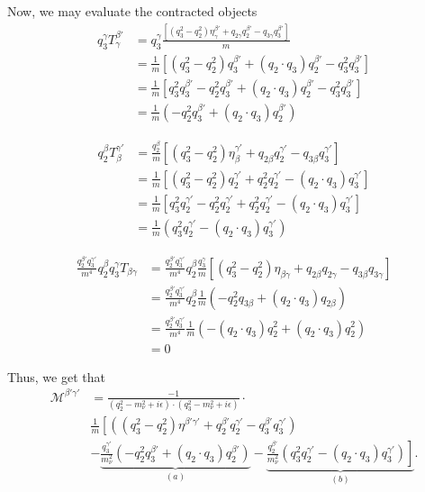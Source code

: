 \documentclass[12pt]{article}
\numberwithin{figure}{section}
\numberwithin{table}{section}
\newcommand{\eps}{\epsilon}
\newcommand{\paren}[1]{\left(#1\right)}
\newcommand{\bracket}[1]{\left[#1\right]}
\newcommand{\p}[1]{\left(#1\right)}
\begin{document}
Now, we may evaluate the contracted objects
\begin{align*}
      q^\gamma_3T_\gamma^{\beta'} &=  q_3^\gamma\frac{\bracket{\paren{q_3^2-q_2^2}\eta_{\gamma}^{\beta'} +q_{2\gamma}q_{2}^{\beta'}-q_{3\gamma}q_{3}^{\beta'} }}{m}\\
    &= \frac{1}{m}\bracket{\paren{q_3^2-q_2^2}q_3^{\beta'}+ (q_2\cdot q_3)q_2^{\beta'} - q_3^2 q_3^{\beta'}}\\
    &=  \frac{1}{m}\bracket{q_3^2q_3^{\beta'}-q_2^2q_3^{\beta'}+ (q_2\cdot q_3)q_2^{\beta'}-q_3^2q_3^{\beta'}}\\
    &= \frac{1}{m}\paren{-q_2^2q_3^{\beta'}+ (q_2\cdot q_3)q_2^{\beta'}}
\end{align*}

\begin{align*}
    q^\beta_2T^{\gamma'}_{\beta} &=  \frac{ q^\beta_2}{m}\bracket{\paren{q_3^2-q_2^2}\eta_{\beta}^{\gamma'} +q_{2\beta}q_{2}^{\gamma'}-q_{3\beta}q_{3}^{\gamma'} }\\
    &= \frac{1}{m}\bracket{\paren{q_3^2-q_2^2}q_2^{\gamma'}+ q_2^2q_2^{\gamma'} - (q_2\cdot q_3)q_3^{\gamma'}}\\
    &=  \frac{1}{m}\bracket{q_3^2q_2^{\gamma'}-q_2^2q_2^{\gamma'}+ q_2^2 q_2^{\gamma'} - (q_2\cdot q_3)q_3^{\gamma'}}\\
    &= \frac{1}{m}\paren{q_3^2q_2^{\gamma'} - (q_2\cdot q_3)q_3^{\gamma'}}
\end{align*}

\begin{align*}
   \frac{q_2^{\beta'}q_3^{\gamma'}}{m^4}q_2^\beta q^\gamma_3 T_{\beta\gamma} &=   \frac{q_2^{\beta'}q_3^{\gamma'}}{m^4}q_2^\beta\frac{q_3^\gamma}{m}\bracket{\paren{q_3^2-q_2^2}\eta_{\beta\gamma} +q_{2\beta}q_{2\gamma}-q_{3\beta}q_{3\gamma} } \\
   &=
   \frac{q_2^{\beta'}q_3^{\gamma'}}{m^4}q_2^\beta\frac{1}{m}\paren{-q_2^2q_{3\beta}+ (q_2\cdot q_3)q_{2\beta}} \\
   &= \frac{q_2^{\beta'}q_3^{\gamma'}}{m^4}\frac{1}{m}\paren{-(q_2\cdot q_3)q_2^2  + (q_2\cdot q_3)q_2^2}\\
   &= 0
\end{align*}

Thus, we get that
\begin{align*}
    \mathcal{M}^{\beta'\gamma'}&= \frac{-1}{\p{q_2^2-m_\nu^2+i\eps}\cdot \paren{q_3^2-m_\nu^2+i\eps}} \cdot \\ &\frac{1}{m} \left[  \paren{\paren{q_3^2-q_2^2}\eta^{\beta'\gamma'} +q_2^{\beta'}q_2^{\gamma'}-q_3^{\beta'}q_3^{\gamma'} }\right.
    \\ &-  \underbrace{\left. \frac{ q_3^{\gamma'}}{m_\nu^2}  \paren{-q_2^2q_3^{\beta'}+ (q_2\cdot q_3)q_2^{\beta'}} \right.}_{(a)} - \underbrace{ \left. \frac{q_2^{\beta'}}{m_\nu^2}   \paren{q_3^2q_2^{\gamma'} - (q_2\cdot q_3)q_3^{\gamma'}}\right]}_{(b)}.
\end{align*}
\end{document}
